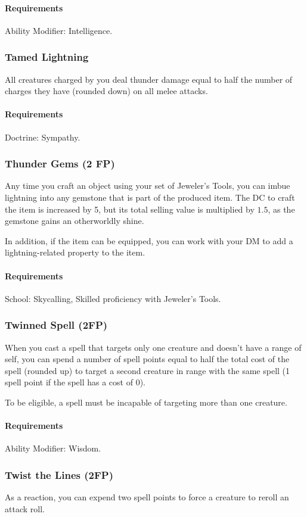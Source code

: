     \paragraph{Requirements} Ability Modifier: Intelligence.
\subsubsection{Tamed Lightning} \label{feat::tamedlightning}
    All creatures charged by you deal thunder damage equal to half the number of charges they have (rounded down) on all melee attacks.
    \paragraph{Requirements} Doctrine: Sympathy.
\subsubsection{Thunder Gems (2 FP)} \label{feat::thundergems}
    Any time you craft an object using your set of Jeweler's Tools, you can imbue lightning into any gemstone that is part of the produced item.
    The DC to craft the item is increased by 5, but its total selling value is multiplied by $1.5$, as the gemstone gains an otherworldly shine.

    In addition, if the item can be equipped, you can work with your DM to add a lightning-related property to the item.
    \paragraph{Requirements} School: Skycalling, Skilled proficiency with Jeweler's Tools.
\subsubsection{Twinned Spell (2FP)} \label{feat::twinnedspell}
    When you cast a spell that targets only one creature and doesn't have a range of self, you can spend a number of spell points equal to half the total cost of the spell (rounded up) to target a second creature in range with the same spell (1 spell point if the spell has a cost of 0).

    To be eligible, a spell must be incapable of targeting more than one creature.
    \paragraph{Requirements} Ability Modifier: Wisdom.
\subsubsection{Twist the Lines (2FP)} \label{feat::twistthelines}
    As a reaction, you can expend two spell points to force a creature to reroll an attack roll.
